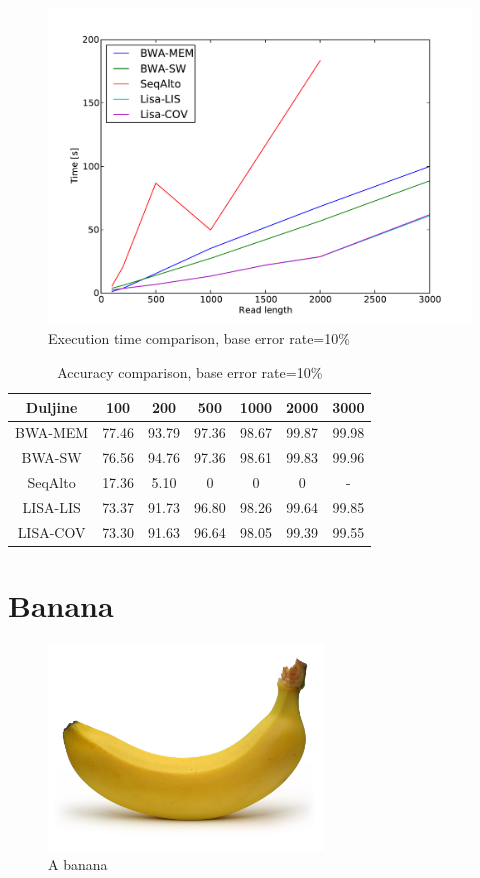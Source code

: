 \documentclass[times, utf8, diplomski]{fer}
\begin{document}
\begin{figure}[H]
\centering
\includegraphics[width=1.0\textwidth]{../img/yersinia-e10-time.pdf}
\caption{Execution time comparison, base error rate=10\%}\label{yersinia-e10-time}
\end{figure}

\begin{table}[H]
\centering
\begin{tabular}{|c||c|c|c|c|c|c|}
\hline
	Duljine & 100 & 200 & 500 & 1000 & 2000 & 3000\\
\hline
\hline
	BWA-MEM & 77.46 & 93.79 & 97.36 & 98.67 & 99.87 & 99.98\\
\hline
	BWA-SW  & 76.56 & 94.76 & 97.36 & 98.61 & 99.83 & 99.96\\
\hline
	SeqAlto & 17.36 & 5.10 & 0 & 0 & 0 & -\\
\hline
	LISA-LIS   & 73.37 & 91.73 & 96.80 & 98.26 & 99.64 & 99.85\\
\hline
	LISA-COV  & 73.30 & 91.63 & 96.64 & 98.05 & 99.39 & 99.55\\
\hline
\end{tabular}
\caption{Accuracy comparison, base error rate=10\%}\label{yersinia-e10-correct}
\end{table}


\section{Banana}

\begin{figure}[H]
\centering
\includegraphics[width=0.65\textwidth]{../img/banana.jpg}
\caption{A banana}\label{banana}
\end{figure}
\end{document}
